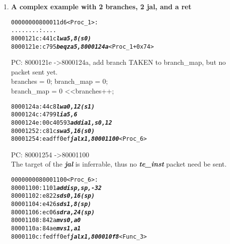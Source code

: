 \begin{enumerate}
\item

   \textbf{A complex example with 2 branches, 2 jal, and a ret}

  \begin {alltt}
00000000800011d6 <Proc\_1>:
    ........:   ....
    8000121c:	441c                	\textbf{\textit{lw	a5,8(s0)}}
    8000121e:	c795                	\textbf{\textit{beqz	a5,8000124a}} <Proc\_1+0x74>
  \end{alltt}
  
  \begin{frame}

  PC: 8000121e -\textgreater 8000124a, add branch TAKEN to branch\_map, but no packet sent yet.\\
  branches = 0; branch\_map = 0;\\
  branch\_map \textbar= 0 \textless\textless branches++;
  \end{frame}
  
\begin{alltt}
    
    8000124a:	44c8                	\textbf{\textit{lw	a0,12(s1)}}
    8000124c:	4799                	\textbf{\textit{li	a5,6}}
    8000124e:	00c40593          	\textbf{\textit{addi	a1,s0,12}}
    80001252:	c81c                	\textbf{\textit{sw	a5,16(s0)}}
    80001254:	eadff0ef          	\textbf{\textit{jal	x1,80001100}} <Proc\_6>
\end{alltt}

  \begin{frame}

  PC: 80001254 -\textgreater 80001100\\
  The target of the \textbf{\textit{jal}} is inferrable, thus no \textbf{\textit{te\_inst}} packet need be sent.\\
  \end{frame}
  

\begin{alltt}
  
    0000000080001100 <Proc\_6>:
    80001100:	1101                    \textbf{\textit{addi	sp,sp,-32}}
    80001102:	e822                    \textbf{\textit{sd	s0,16(sp)}}
    80001104:	e426                    \textbf{\textit{sd	s1,8(sp)}}
    80001106:	ec06                    \textbf{\textit{sd	ra,24(sp)}}
    80001108:	842a                    \textbf{\textit{mv	s0,a0}}
    8000110a:	84ae                    \textbf{\textit{mv	s1,a1}}
    8000110c:	fedff0ef                \textbf{\textit{jal	x1,800010f8}} <Func\_3>
\end{alltt}


\end{enumerate}
